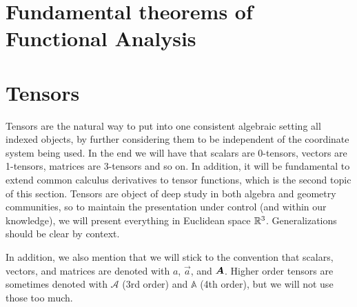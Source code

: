 \section{Fundamental theorems of Functional Analysis}

\section{Tensors}
Tensors are the natural way to put into one consistent algebraic setting all indexed objects, by further considering them to be independent of the coordinate system being used. In the end we will have that scalars are 0-tensors, vectors are 1-tensors, matrices are 3-tensors and so on. In addition, it will be fundamental to extend common calculus derivatives to tensor functions, which is the second topic of this section. Tensors are object of deep study in both algebra and geometry communities, so to maintain the presentation under control (and within our knowledge), we will present everything in Euclidean space $\mathbb{R}^3$. Generalizations should be clear by context. 

In addition, we also mention that we will stick to the convention that scalars, vectors, and matrices are denoted with $a$, $\vec a$, and $\mat A$. Higher order tensors are sometimes denoted with $\mathcal A$ (3rd order) and $\mathbb A$ (4th order), but we will not use those too much. 

